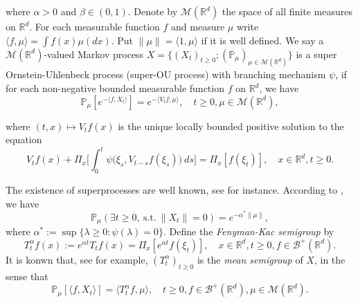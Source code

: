 \documentclass[12pt,oneside,english]{amsart}
\theoremstyle{plain}
\theoremstyle{definition}
\numberwithin{equation}{section}
\begin{document}
        where $\alpha > 0$ and $\beta \in (0,1) $.
    Denote by $\mathcal{M}(\mathbb{R}^d)$ the space of all finite measures on $\mathbb{R}^d$.
    For each measurable function $f$ and measure $\mu$ write $\langle f,\mu\rangle = \int f(x)\mu(dx)$.
    Put $\|\mu\|=\langle 1,\mu\rangle$ if it is well defined.
    We say a $\mathcal{M}(\mathbb{R}^d)$-valued Markov process $X = \{(X_t)_{t\geq 0}; (\mathbb{P}_{\mu})_{\mu \in \mathcal M(\mathbb R^d)}\}$ is a super Ornstein-Uhlenbeck process (super-OU process) with branching mechanism $\psi$, if for each non-negative bounded measurable function $f$ on $\mathbb{R}^d$, we have
\begin{equation} \label{super}
    \mathbb{P}_{\mu}[e^{-\langle f,X_t \rangle}]
    = e^{-\langle V_tf, \mu \rangle},
    \quad t\geq 0, \mu \in \mathcal M(\mathbb R^d),
\end{equation}

    where $(t,x) \mapsto V_tf(x)$ is the unique locally bounded positive solution to the equation
\begin{equation}\label{eq1}
	V_tf(x) + \Pi_x \Big[ \int_0^t\psi\big(\xi_s,V_{t-s}f(\xi_s)\big)~ds\Big]
	= \Pi_x [f(\xi_t)],
    \quad x\in \mathbb R^d, t\geq 0.
\end{equation}	

	The existence of superprocesses are well known, see \cite{EB} for instance.
    According to \cite[Theorem 12.5 \& Theorem 12.7]{Kyprianou2014Fluctuations}, we have
\begin{equation}
    \mathbb{P}_{\mu} (\exists t\geq 0,~\text{s.t.}~\|X_t\|=0)
    = e^{-\alpha^* \|\mu\|},
\end{equation}
    where $\alpha^* := \sup\{\lambda \geq 0: \psi(\lambda) = 0\}$.
    Define the \emph{Fenyman-Kac semigroup} by
\begin{equation}\label{meansemigroup}
    T^{\alpha}_t f(x)
    :=
    e^{\alpha t} T_t f(x) =
    \Pi_x [e^{\alpha t}f(\xi_t)],
    \quad x\in \mathbb{R}^d,t\geq 0, f\in \mathscr B^+(\mathbb R^d).
\end{equation}
    It is konwn that, see \cite[Proposition 2.27]{Li2011Measure-valued} for example, $(T^\alpha_t)_{t\geq 0}$ is the \emph{mean semigroup} of $X$, in the sense that
\begin{equation}\label{eq:meanformula}
    \mathbb{P}_{\mu}[\langle f, X_t \rangle]
    = \langle T_t^\alpha f, \mu \rangle,
    \quad t\geq 0, f\in \mathscr B^+(\mathbb R^d), \mu \in \mathcal M(\mathbb R^d).
\end{equation}
\end{document}
